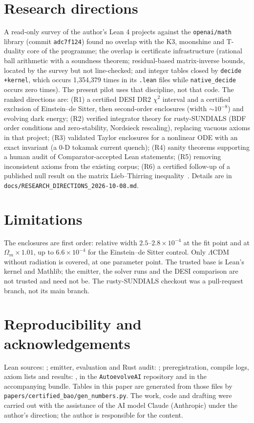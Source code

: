 \documentclass[11pt]{article}
\theoremstyle{remark}
\begin{document}
\section{Research directions}\label{sec:dir}
A read-only survey of the author's Lean 4 projects against the \texttt{openai/math} library (commit \texttt{adc7f124}) found no
overlap with the K3, moonshine and T-duality core of the programme; the overlap is certificate infrastructure (rational ball
arithmetic with a soundness theorem; residual-based matrix-inverse bounds, located by the survey but not line-checked; and integer
tables closed by \texttt{decide +kernel}, which occurs 1,354,379 times in its \texttt{.lean} files while \texttt{native\_decide}
occurs zero times). The present pilot uses that discipline, not that code. The ranked directions are:
(R1) a certified DESI DR2 $\chi^2$ interval and a certified exclusion of Einstein--de Sitter, then second-order enclosures (width
$\sim10^{-8}$) and evolving dark energy; (R2) verified integrator theory for rusty-SUNDIALS (BDF order conditions and zero-stability,
Nordsieck rescaling), replacing vacuous axioms in that project; (R3) validated Taylor enclosures for a nonlinear ODE with an exact
invariant (a 0-D tokamak current quench); (R4) sanity theorems supporting a human audit of Comparator-accepted Lean statements;
(R5) removing inconsistent axioms from the existing corpus; (R6) a certified follow-up of a published null result on the matrix
Lieb--Thirring inequality~\cite{ltnull}. Details are in \texttt{docs/RESEARCH\_DIRECTIONS\_2026-10-08.md}.

\section{Limitations}
The enclosures are first order: relative width $2.5$--$2.8\times10^{-4}$ at the fit point and at $\Omega_m\times1.01$, up to $6.6\times10^{-4}$ for the Einstein--de Sitter control. Only $\Lambda$CDM without radiation is covered, at one parameter point.
The trusted base is Lean's kernel and Mathlib; the emitter, the solver runs and the DESI comparison are not trusted and need not be.
The rusty-SUNDIALS checkout was a pull-request branch, not its main branch.

\section*{Reproducibility and acknowledgements}
Lean sources: ; emitter, evaluation and Rust audit: ; preregistration,
compile logs, axiom lists and results: , in the \texttt{AutoevolveAI} repository and in the
accompanying bundle. Tables in this paper are generated from those files by \texttt{papers/certified\_bao/gen\_numbers.py}. The work,
code and drafting were carried out with the assistance of the AI model Claude (Anthropic) under the author's direction; the author is
responsible for the content.
\end{document}
